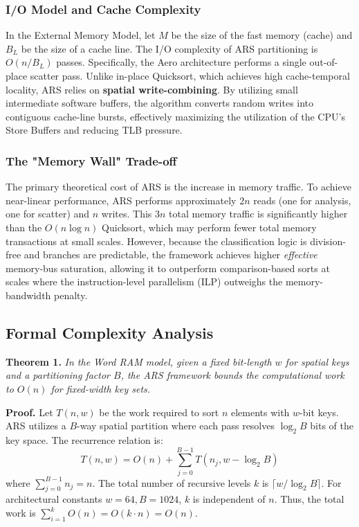 \subsubsection{I/O Model and Cache Complexity}
In the External Memory Model, let $M$ be the size of the fast memory (cache) and $B_L$ be the size of a cache line. The I/O complexity of ARS partitioning is $O(n/B_L)$ passes. Specifically, the Aero architecture performs a single out-of-place scatter pass. Unlike in-place Quicksort, which achieves high cache-temporal locality, ARS relies on \textbf{spatial write-combining}. By utilizing small intermediate software buffers, the algorithm converts random writes into contiguous cache-line bursts, effectively maximizing the utilization of the CPU's Store Buffers and reducing TLB pressure.

\subsubsection{The "Memory Wall" Trade-off}
The primary theoretical cost of ARS is the increase in memory traffic. To achieve near-linear performance, ARS performs approximately $2n$ reads (one for analysis, one for scatter) and $n$ writes. This $3n$ total memory traffic is significantly higher than the $O(n \log n)$ Quicksort, which may perform fewer total memory transactions at small scales. However, because the classification logic is division-free and branches are predictable, the framework achieves higher \textit{effective} memory-bus saturation, allowing it to outperform comparison-based sorts at scales where the instruction-level parallelism (ILP) outweighs the memory-bandwidth penalty.

\subsection{Formal Complexity Analysis}
\textbf{Theorem 1.} \textit{In the Word RAM model, given a fixed bit-length $w$ for spatial keys and a partitioning factor $B$, the ARS framework bounds the computational work to $O(n)$ for fixed-width key sets.}

\textbf{Proof.} Let $T(n, w)$ be the work required to sort $n$ elements with $w$-bit keys. ARS utilizes a $B$-way spatial partition where each pass resolves $\log_2 B$ bits of the key space. The recurrence relation is:
\begin{equation}
T(n, w) = O(n) + \sum_{j=0}^{B-1} T(n_j, w - \log_2 B)
\end{equation}
where $\sum_{j=0}^{B-1} n_j = n$. The total number of recursive levels $k$ is $\lceil w / \log_2 B \rceil$. For architectural constants $w=64, B=1024$, $k$ is independent of $n$. Thus, the total work is $\sum_{i=1}^{k} O(n) = O(k \cdot n) = O(n)$. 

